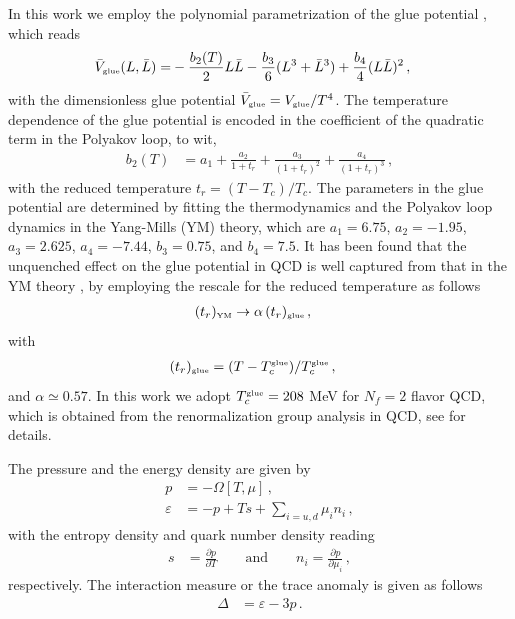 \documentclass[%
reprint,
superscriptaddress,
showpacs,preprintnumbers,
 amsmath,amssymb,
 aps,
prd,
]{revtex4-1}
\begin{document}
In this work we employ the polynomial parametrization of the glue potential \cite{Ratti:2005jh}, which reads 
\begin{align}
  \bar V_{\text{\tiny{glue}}}(L,\bar L)=& -\frac{b_2(T)}{2}L\bar{L}-\frac{b_3}{6}(L^3+\bar{L}^3)+\frac{b_4}{4}(L\bar{L})^2\,,\label{eq:Glueppoly}
\end{align}
with the dimensionless glue potential $\bar V_{\text{\tiny{glue}}}=V_{\text{\tiny{glue}}}/T^4$. The temperature dependence of the glue potential is encoded in the coefficient of the quadratic term in the Polyakov loop, to wit,
\begin{align}
  b_2(T)&=a_1+\frac{a_2}{1+t_r}+\frac{a_3}{(1+t_r)^2}+\frac{a_4}{(1+t_r)^3}\,,\label{eq:b2}
\end{align}
with the reduced temperature $t_r=(T-T_c)/T_c$. The parameters in the glue potential are determined by fitting the thermodynamics and the Polyakov loop dynamics in the Yang-Mills (YM) theory, which are $a_1=6.75$, $a_2=-1.95$, $a_3=2.625$, $a_4=-7.44$,  $b_3=0.75$, and $b_4=7.5$. It has been found that the unquenched effect on the glue potential in QCD is well captured from that in the YM theory \cite{Haas:2013qwp}, by employing the rescale for the reduced temperature as follows
\begin{align}
  (t_r)_{\text{\tiny{YM}}}&\rightarrow \alpha\,(t_r)_{\text{\tiny{glue}}}\,,\label{}
\end{align}
with
\begin{align}
  (t_r)_{\text{\tiny{glue}}}&=(T-T_c^\text{\tiny{glue}})/T_c^\text{\tiny{glue}}\,,\label{}
\end{align}
and $\alpha \simeq 0.57$. In this work we adopt $T_c^\text{\tiny{glue}}=208$ MeV for $N_f=2$ flavor QCD, which is obtained from the renormalization group analysis in QCD, see \cite{Schaefer:2007pw} for details.

The pressure and the energy density are given by
\begin{align}
  p&=-\Omega[T,\mu]\,,\\[2ex]
 \varepsilon&=-p+Ts +\sum_{i=u,d}\mu_i n_i\,,\label{}
\end{align}
with the entropy density and quark number density reading 
\begin{align}
  s&=\frac{\partial p}{\partial T}\qquad \text{and}\qquad n_i=\frac{\partial p}{\partial \mu_i}\,,\label{}
\end{align}
respectively. The interaction measure or the trace anomaly is given as follows
\begin{align}
  \Delta&=\varepsilon-3p\,.\label{}
\end{align}
\end{document}
